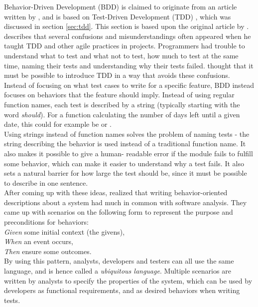 Behavior-Driven Development (BDD) is claimed to originate from an
article written by \citet{web:dan_north}, and is based on Test-Driven
Development (TDD) \cite{wiki:bdd}, which was discussed in section
\ref{sec:tdd}. This section is based upon the original article by
\citet{web:dan_north}.\\

\citeauthor{web:dan_north} describes that several confusions and
misunderstandings often appeared when he taught TDD and other agile
practices in projects. Programmers had trouble to understand what to
test and what not to test, how much to test at the same time, naming
their tests and understanding why their tests failed.
\citeauthor{web:dan_north} thought that it must be possible to introduce
TDD in a way that avoids these confusions.\\

Instead of focusing on what test cases to write for a specific feature,
BDD instead focuses on behaviors that the feature should imply. Instead
of using regular function names, each test is described by a string
(typically starting with the word \emph{should}). For a function
calculating the number of days left until a given date, this could for
example be  or
.\\

Using strings instead of function names solves the problem of naming
tests - the string describing the behavior is used instead of a
traditional function name. It also makes it possible to give a human-
readable error if the module fails to fulfill some behavior, which can
make it easier to understand why a test fails. It also sets a natural
barrier for how large the test should be, since it must be possible to
describe in one sentence.\\

After coming up with these ideas, \citeauthor{web:dan_north} realized
that writing behavior-oriented descriptions about a system had much in
common with software analysis. They came up with scenarios on the
following form to represent the purpose and preconditions for
behaviors:\\

\emph{Given} some initial context (the givens),\\
\emph{When} an event occurs,\\
\emph{Then} ensure some outcomes.\\

By using this pattern, analysts, developers and testers can all use the
same language, and is hence called a \emph{ubiquitous language}. Multiple
scenarios are written by analysts to specify the properties of the
system, which can be used by developers as functional requirements, and
as desired behaviors when writing tests.\\
